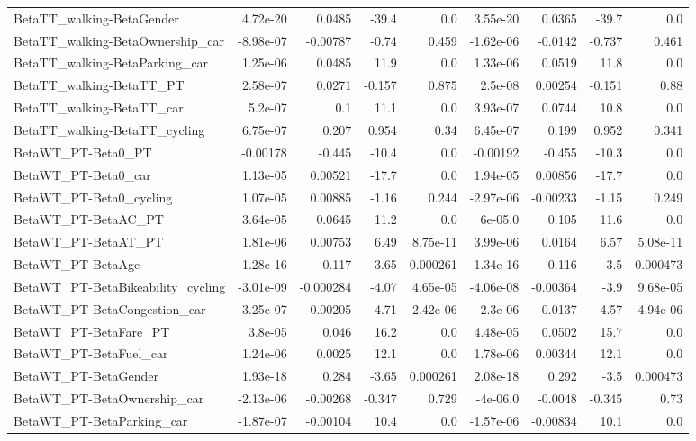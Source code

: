 \begin{tabular}{lrrrrrrrr}
BetaTT_walking-BetaGender & 4.72e-20 & 0.0485 & -39.4 & 0.0 & 3.55e-20 & 0.0365 & -39.7 & 0.0 \\
BetaTT_walking-BetaOwnership_car & -8.98e-07 & -0.00787 & -0.74 & 0.459 & -1.62e-06 & -0.0142 & -0.737 & 0.461 \\
BetaTT_walking-BetaParking_car & 1.25e-06 & 0.0485 & 11.9 & 0.0 & 1.33e-06 & 0.0519 & 11.8 & 0.0 \\
BetaTT_walking-BetaTT_PT & 2.58e-07 & 0.0271 & -0.157 & 0.875 & 2.5e-08 & 0.00254 & -0.151 & 0.88 \\
BetaTT_walking-BetaTT_car & 5.2e-07 & 0.1 & 11.1 & 0.0 & 3.93e-07 & 0.0744 & 10.8 & 0.0 \\
BetaTT_walking-BetaTT_cycling & 6.75e-07 & 0.207 & 0.954 & 0.34 & 6.45e-07 & 0.199 & 0.952 & 0.341 \\
BetaWT_PT-Beta0_PT & -0.00178 & -0.445 & -10.4 & 0.0 & -0.00192 & -0.455 & -10.3 & 0.0 \\
BetaWT_PT-Beta0_car & 1.13e-05 & 0.00521 & -17.7 & 0.0 & 1.94e-05 & 0.00856 & -17.7 & 0.0 \\
BetaWT_PT-Beta0_cycling & 1.07e-05 & 0.00885 & -1.16 & 0.244 & -2.97e-06 & -0.00233 & -1.15 & 0.249 \\
BetaWT_PT-BetaAC_PT & 3.64e-05 & 0.0645 & 11.2 & 0.0 & 6e-05.0 & 0.105 & 11.6 & 0.0 \\
BetaWT_PT-BetaAT_PT & 1.81e-06 & 0.00753 & 6.49 & 8.75e-11 & 3.99e-06 & 0.0164 & 6.57 & 5.08e-11 \\
BetaWT_PT-BetaAge & 1.28e-16 & 0.117 & -3.65 & 0.000261 & 1.34e-16 & 0.116 & -3.5 & 0.000473 \\
BetaWT_PT-BetaBikeability_cycling & -3.01e-09 & -0.000284 & -4.07 & 4.65e-05 & -4.06e-08 & -0.00364 & -3.9 & 9.68e-05 \\
BetaWT_PT-BetaCongestion_car & -3.25e-07 & -0.00205 & 4.71 & 2.42e-06 & -2.3e-06 & -0.0137 & 4.57 & 4.94e-06 \\
BetaWT_PT-BetaFare_PT & 3.8e-05 & 0.046 & 16.2 & 0.0 & 4.48e-05 & 0.0502 & 15.7 & 0.0 \\
BetaWT_PT-BetaFuel_car & 1.24e-06 & 0.0025 & 12.1 & 0.0 & 1.78e-06 & 0.00344 & 12.1 & 0.0 \\
BetaWT_PT-BetaGender & 1.93e-18 & 0.284 & -3.65 & 0.000261 & 2.08e-18 & 0.292 & -3.5 & 0.000473 \\
BetaWT_PT-BetaOwnership_car & -2.13e-06 & -0.00268 & -0.347 & 0.729 & -4e-06.0 & -0.0048 & -0.345 & 0.73 \\
BetaWT_PT-BetaParking_car & -1.87e-07 & -0.00104 & 10.4 & 0.0 & -1.57e-06 & -0.00834 & 10.1 & 0.0 \\

\end{tabular}
